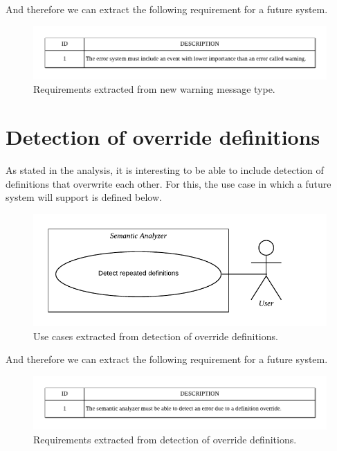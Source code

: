 And therefore we can extract the following requirement for a future system.

\begin{figure}[h!]
    \includegraphics[scale=0.8]{images/warn-req.pdf}
    \centering
    \caption[Requirements extracted from new warning message type]{Requirements extracted from new warning message type.}
    \label{fig:warn-req}
\end{figure}

\section{Detection of override definitions}
As stated in the analysis, it is interesting to be able to include detection of
definitions that overwrite each other. For this, the use case in which a future
system will support is defined below.

\begin{figure}[h!]
    \includegraphics[scale=0.8]{images/def-override-use-case.pdf}
    \centering
    \caption[Use cases extracted from detection of override definitions]{Use cases extracted from detection of override definitions.}
    \label{fig:def-overr-use-case}
\end{figure}

And therefore we can extract the following requirement for a future system.

\begin{figure}[h!]
    \includegraphics[scale=0.8]{images/def-override-req.pdf}
    \centering
    \caption[Requirements extracted from detection of override definitions]{Requirements extracted from detection of override definitions.}
    \label{fig:def-overr-req}
\end{figure}

